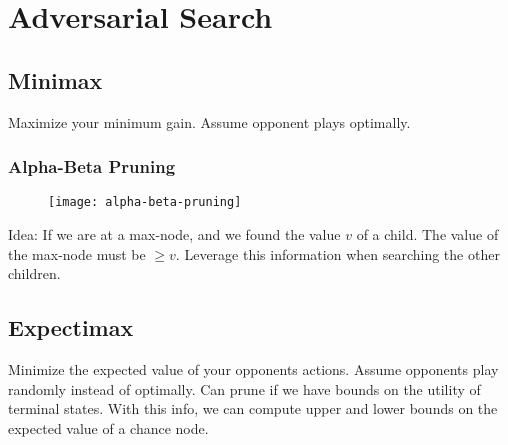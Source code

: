 \section{Adversarial Search}
\subsection{Minimax}
Maximize your minimum gain. Assume opponent plays optimally.
\subsubsection{Alpha-Beta Pruning}
\begin{figure}[H]
\centering
\texttt{[image: alpha-beta-pruning]}
\end{figure}

Idea: If we are at a max-node, and we found the value $v$ of a child. The value of the max-node must be $\geq v$. 
Leverage this information when searching the other children.

\subsection{Expectimax}
Minimize the expected value of your opponents actions. Assume opponents play randomly instead of optimally. Can prune if we have bounds on the utility of terminal states. With this info, we can compute upper and lower bounds on the expected value of a chance node.